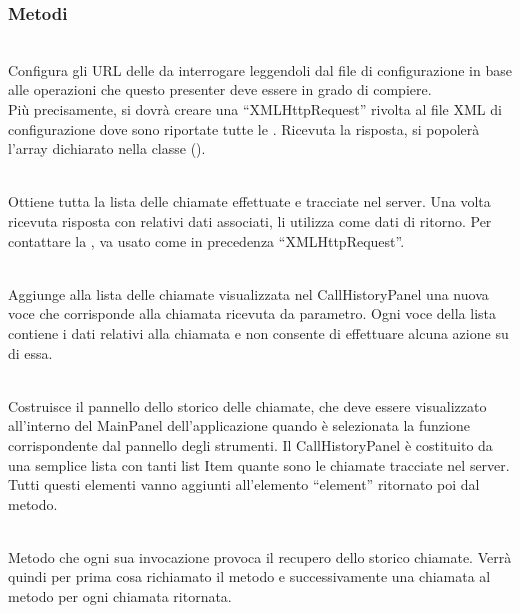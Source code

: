\subsubsection*{Metodi}
\begin{description}
\item{}\\
Configura gli URL delle  da interrogare leggendoli dal file di configurazione in base alle operazioni che questo presenter deve essere in grado di compiere.\\
Più precisamente, si dovrà creare una ``XMLHttpRequest'' rivolta al file XML di configurazione dove sono riportate tutte le . Ricevuta la risposta, si popolerà l'array dichiarato nella classe ().

\item{}\\
Ottiene tutta la lista delle chiamate effettuate e tracciate nel server. Una volta ricevuta risposta con relativi dati associati, li utilizza come dati di ritorno. Per contattare la , va usato come in precedenza ``XMLHttpRequest''.

\item{}\\
Aggiunge alla lista delle chiamate visualizzata nel CallHistoryPanel una nuova voce che corrisponde alla chiamata ricevuta da parametro. Ogni voce della lista contiene i dati relativi alla chiamata e non consente di effettuare alcuna azione su di essa.

\item{}\\
Costruisce il pannello dello storico delle chiamate, che deve essere visualizzato all'interno del MainPanel dell'applicazione quando è selezionata la funzione corrispondente dal pannello degli strumenti. Il CallHistoryPanel è costituito da una semplice lista con tanti list Item quante sono le chiamate tracciate nel server. Tutti questi elementi vanno aggiunti all'elemento ``element'' ritornato poi dal metodo.

\item{}\\
Metodo che ogni sua invocazione provoca il recupero dello storico chiamate. Verrà quindi per prima cosa richiamato il metodo  e successivamente una chiamata al metodo  per ogni chiamata ritornata.

\end{description}

